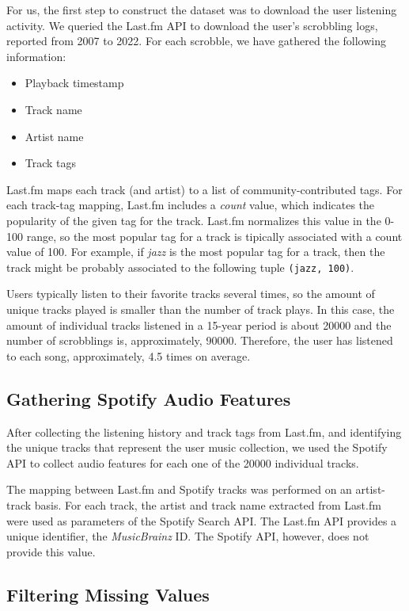 \documentclass[sn-mathphys]{sn-jnl}%
\theoremstyle{thmstyleone}%
\theoremstyle{thmstyletwo}%
\theoremstyle{thmstylethree}%
\begin{document}
For us, the first step to construct the dataset was to download the user listening activity.
We queried the Last.fm API to download the user{'}s scrobbling logs, reported from 2007 to 2022.
For each scrobble, we have gathered the following information:

\begin{itemize}
\item Playback timestamp
\item Track name
\item Artist name
\item Track tags
\end{itemize}

Last.fm maps each track (and artist) to a list of community-contributed tags.
For each track-tag mapping, Last.fm includes
a \emph{count} value, which indicates the popularity of the given tag for the track.
Last.fm normalizes this value in the 0-100 range, so the most popular tag for a track is tipically associated with a
count value of 100.
For example, if \emph{jazz} is the most popular tag for a track,
then the track might be probably associated to the following tuple \verb|(jazz, 100)|.

Users typically listen to their favorite tracks several times,
so the amount of unique tracks played is smaller
than the number of track plays. In this case, the amount of
individual tracks listened in a 15-year period is about \num{20000} and the number of scrobblings is, approximately, \num{90000}.
Therefore, the user has listened to each song, approximately, \num{4.5} times on average.


\subsection{Gathering Spotify Audio Features}

After collecting the listening history and track tags from Last.fm, and identifying the unique
tracks that represent the user music collection, we used the Spotify API to
collect audio features for each one of the \num{20000} individual tracks.


The mapping between Last.fm and Spotify tracks was performed on an artist-track basis.
For each track, the artist and track name extracted from Last.fm were used as parameters of the Spotify Search API.
The Last.fm API provides a unique identifier, the \emph{MusicBrainz} ID.
The Spotify API, however, does not provide this value.

\subsection{Filtering Missing Values}
\end{document}
